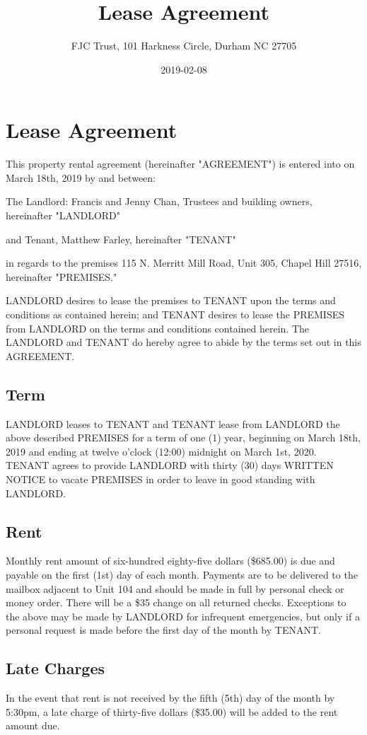 \documentclass[11pt]{article}
\author{FJC Trust, 101 Harkness Circle, Durham NC 27705}
\date{2019-02-08}
\title{Lease Agreement}
\begin{document}
\section*{Lease Agreement}
\label{sec:orgf9a2d50}
This property rental agreement (hereinafter "AGREEMENT") is entered
into on March 18th, 2019 by and between:

The Landlord: Francis and Jenny Chan, Trustees and building owners,
hereinafter "LANDLORD"

and Tenant, Matthew Farley, hereinafter "TENANT"

in regards to the premises 115 N. Merritt Mill Road, Unit 305,
Chapel Hill 27516, hereinafter "PREMISES."

LANDLORD desires to lease the premises to TENANT upon the terms and
conditions as contained herein; and TENANT desires to lease the
PREMISES from LANDLORD on the terms and conditions contained herein.
The LANDLORD and TENANT do hereby agree to abide by the terms set out
in this AGREEMENT.

\subsection*{Term}
\label{sec:org9473461}
LANDLORD leases to TENANT and TENANT lease from LANDLORD the above
described PREMISES for a term of one (1) year, beginning on
March 18th, 2019 and ending at twelve o'clock (12:00) midnight on
March 1st, 2020.  TENANT agrees to provide LANDLORD with thirty (30)
days WRITTEN NOTICE to vacate PREMISES in order to leave in good
standing with LANDLORD.

\subsection*{Rent}
\label{sec:orgb4fb719}
Monthly rent amount of six-hundred eighty-five dollars (\$685.00) is due
and payable on the first (1st) day of each month.  Payments are to be
delivered to the mailbox adjacent to Unit 104 and should be made in
full by personal check or money order.  There will be a \$35 change on
all returned checks.  Exceptions to the above may be made by LANDLORD
for infrequent emergencies, but only if a personal request is made
before the first day of the month by TENANT.

\subsection*{Late Charges}
\label{sec:org0b1f903}
In the event that rent is not received by the fifth (5th) day of the
month by 5:30pm, a late charge of thirty-five dollars (\$35.00) will be
added to the rent amount due.
\end{document}
